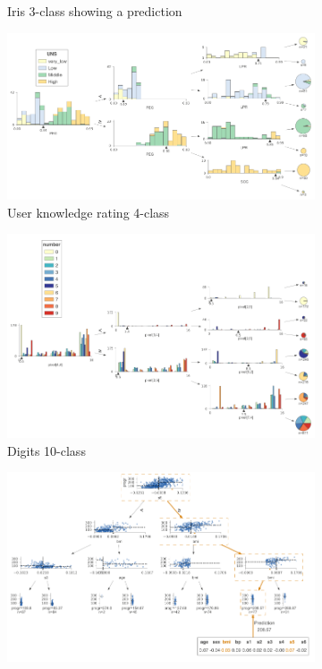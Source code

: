 \begin{figure}[p]
\begin{subfigure}{0.48\textwidth}
        \caption{Iris 3-class showing a prediction}
        \label{fig:tool_comparison_iris-TD-3-X}
    \end{subfigure}\hfill
    \begin{subfigure}{0.48\textwidth}
        \includegraphics[width=\linewidth]{images/knowledge-LR-3.png}
        \caption{User knowledge rating 4-class}
        \label{fig:tool_comparison_knowledge-LR-3}
    \end{subfigure}
    \vspace{0.5cm}
    \begin{subfigure}{0.48\textwidth}
        \includegraphics[width=\linewidth]{images/digits-LR-3.png}
        \caption{Digits 10-class}
        \label{fig:tool_comparison_digits-LR-3}
    \end{subfigure}\hfill
    \begin{subfigure}{0.48\textwidth}
        \includegraphics[width=\linewidth]{images/diabetes-TD-3-X.png}

\end{subfigure}
\end{figure}
